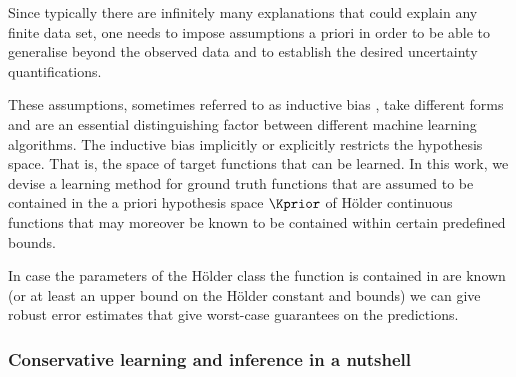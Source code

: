 Since typically there are infinitely many explanations that could explain any finite data set, one needs to impose assumptions a priori in order to be able to generalise beyond the observed data and to establish the desired uncertainty quantifications. 

These assumptions, sometimes referred to as inductive bias \cite{mitchellbook:97}, take different forms and are an essential distinguishing factor between different machine learning algorithms. 
The inductive bias implicitly or explicitly restricts the hypothesis space. That is, the space of target functions that can be learned.
In this work, we devise a learning method for ground truth functions that are assumed to be contained in the a priori hypothesis space $\Kprior$ of H\"older continuous functions that may moreover be known to be contained within certain predefined bounds. 

In case the parameters of the H\"older class the function is contained in are known (or at least an upper bound on the H\"older constant and bounds) we can give robust error estimates that give worst-case guarantees on the predictions.

\subsubsection{Conservative learning and inference in a nutshell }

